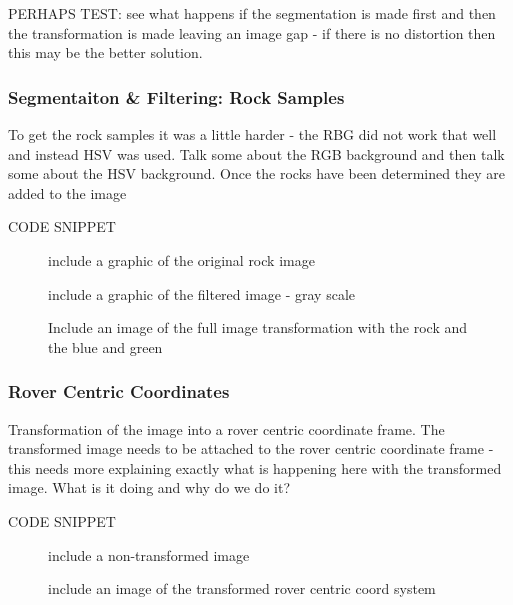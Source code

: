\documentclass[a4paper]{article}
\begin{document}
PERHAPS TEST: see what happens if the segmentation is made first and then the transformation is made leaving an image gap - if there is no distortion then this may be the better solution.

\subsubsection{Segmentaiton \& Filtering: Rock Samples}
To get the rock samples it was a little harder - the RBG did not work that well and instead HSV was used. Talk some about the RGB background and then talk some about the HSV background. Once the rocks have been determined they are added to the image

CODE SNIPPET

\begin{figure}
\begin{minipage}{0.45\linewidth}
\centering
\caption{include a graphic of the original rock image}
\end{minipage}
\begin{minipage}{0.45\linewidth}
\centering
\caption{include a graphic of the filtered image - gray scale}
\end{minipage}
\end{figure}

\begin{figure}
\centering
\caption{Include an image of the full image transformation with the rock and the blue and green}
\end{figure}

\subsubsection{Rover Centric Coordinates}
Transformation of the image into a rover centric coordinate frame. The transformed image needs to be attached to the rover centric coordinate frame - this needs more explaining exactly what is happening here with the transformed image. What is it doing and why do we do it?

CODE SNIPPET

\begin{figure}
\begin{minipage}{0.45\linewidth}
\centering
\caption{include a non-transformed image}
\end{minipage}
\begin{minipage}{0.45\linewidth}
\centering
\caption{include an image of the transformed rover centric coord system}
\end{minipage}
\end{figure}
\end{document}
